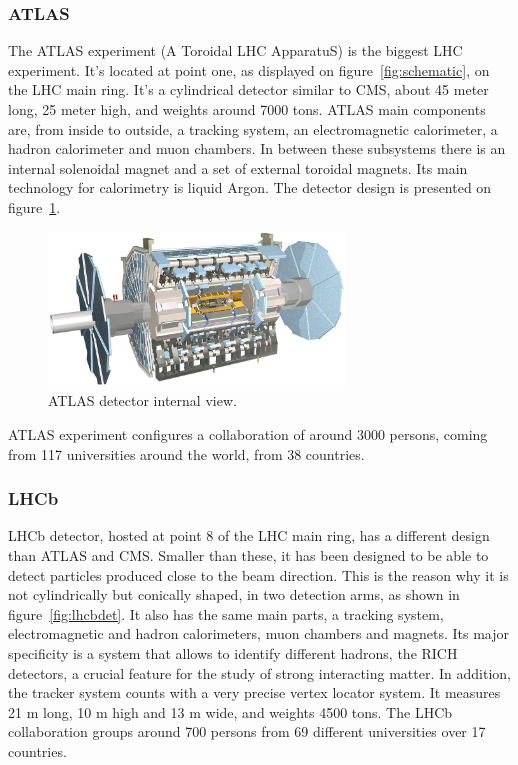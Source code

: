 \subsubsection{ATLAS}
\label{sec:atlas}

The ATLAS experiment (A Toroidal LHC ApparatuS) is the biggest LHC experiment. It's located at point one, as displayed on figure~\ref{fig:schematic}, on the LHC main ring. It's a cylindrical detector similar to CMS, about 45 meter long, 25 meter high, and weights around 7000 tons. ATLAS main components are, from inside to outside, a tracking system, an electromagnetic calorimeter, a hadron calorimeter and muon chambers. In between these subsystems there is an internal solenoidal magnet and a set of external toroidal magnets. Its main technology for calorimetry is liquid Argon. The detector design is presented on figure~\ref{fig:atlasdet}.

\begin{figure}[!Hhtbp]
  \begin{center}
    \includegraphics[width=0.7\textwidth]{figs/atlas_lg.jpg}
    \caption{ATLAS detector internal view. }
    \label{fig:atlasdet}
  \end{center}
\end{figure}

ATLAS experiment configures a collaboration of around 3000 persons, coming from 117 universities around the world, from 38 countries.

\subsubsection{LHCb}
\label{sec:lhcb}

LHCb detector, hosted at point 8 of the LHC main ring, has a different design than ATLAS and CMS. Smaller than these, it has been designed to be able to detect particles produced close to the beam direction. This is the reason why it is not cylindrically but conically shaped, in two detection arms, as shown in figure~\ref{fig:lhcbdet}. It also has the same main parts, a tracking system, electromagnetic and hadron calorimeters, muon chambers and magnets. Its major specificity is a system that allows to identify different hadrons, the RICH detectors, a crucial feature for the study of strong interacting matter. In addition, the tracker system counts with a very precise vertex locator system. It measures 21 m long, 10 m high and 13 m wide, and weights 4500 tons. The LHCb collaboration groups around 700 persons from 69 different universities over 17 countries. 

